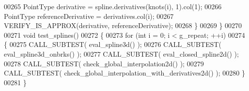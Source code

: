 \begin{DoxyCode}
00265     PointType derivative = spline.derivatives(knots(i), 1).col(1);
00266     PointType referenceDerivative = derivatives.col(i);
00267     VERIFY\_IS\_APPROX(derivative, referenceDerivative);
00268   \}
00269 \}
00270 
00271 \textcolor{keywordtype}{void} test\_splines()
00272 \{
00273   \textcolor{keywordflow}{for} (\textcolor{keywordtype}{int} i = 0; i < g\_repeat; ++i)
00274   \{
00275     CALL\_SUBTEST( eval\_spline3d() );
00276     CALL\_SUBTEST( eval\_spline3d\_onbrks() );
00277     CALL\_SUBTEST( eval\_closed\_spline2d() );
00278     CALL\_SUBTEST( check\_global\_interpolation2d() );
00279     CALL\_SUBTEST( check\_global\_interpolation\_with\_derivatives2d() );
00280   \}
00281 \}
\end{DoxyCode}
